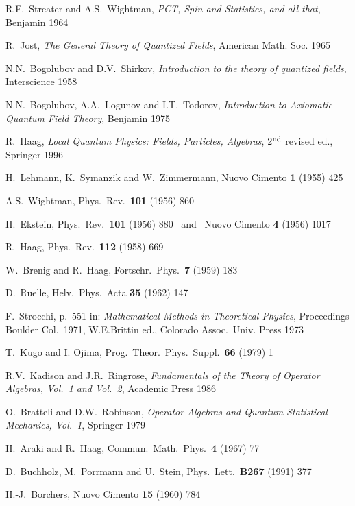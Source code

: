 \begin{thebibliography}{99}
\small 
{}
R.F.\ Streater and A.S.\ Wightman,
{\em PCT, Spin and Statistics, and all that},  
Benjamin 1964 

R.\ Jost,  
{\em The General Theory of Quantized Fields}, 
American Math. Soc. 1965 

 N.N.\ Bogolubov and D.V.\ Shirkov, 
{\em Introduction to the theory of quantized fields}, 
Interscience 1958 

N.N.\ Bogolubov, A.A.\ Logunov and I.T.\ Todorov, 
{\em Introduction to Axiomatic Quantum Field Theory}, 
Benjamin 1975

R.\ Haag, 
{\em Local Quantum Physics: Fields, Particles, Algebras},
2$^{\rm nd}$ revised ed.,  
Springer 1996 

H.\ Lehmann, K.\ Symanzik and W.\ Zimmermann, 
Nuovo Cimento {\bf 1} (1955) 425

 A.S.\ Wightman, Phys.\ Rev.\ {\bf 101} (1956) 860

 H.\ Ekstein, Phys.\ Rev.\ {\bf 101} (1956) 880
\ and \ Nuovo Cimento {\bf 4} (1956) 1017 

 R.\ Haag, Phys.\ Rev.\ {\bf 112} (1958) 669

 W.\ Brenig and R.\ Haag, Fortschr.\ Phys.\ {\bf 7}
(1959) 183

 D.\ Ruelle, Helv.\ Phys.\ Acta {\bf 35} (1962) 147

 F.\ Strocchi, 
p.\ 551 in: {\em Mathematical Methods in 
Theoretical Physics}, Proceedings Boulder Col.\ 1971, W.E.Brittin ed., 
Colorado Assoc.\ Univ. Press 1973

 T.\ Kugo and I. Ojima, 
Prog.\ Theor.\ Phys.\ Suppl.\ {\bf 66} (1979) 1

 R.V.\ Kadison and J.R.\ Ringrose,
{\it Fundamentals of the Theory of Operator Algebras, Vol.\ 1 and 
Vol.\ 2}, Academic Press 1986

 O.\ Bratteli and D.W.\ Robinson, {\it Operator Algebras
and Quantum Statistical Mechanics, Vol.\ 1}, Springer 1979

 H.\ Araki and R.\ Haag, Commun.\ Math.\ Phys.\ {\bf 4}
(1967) 77

 D.\ Buchholz, M.\ Porrmann and U.\ Stein, 
Phys.\ Lett.\ {\bf B267} (1991) 377 

 H.-J.\ Borchers, Nuovo Cimento {\bf 15} (1960) 784 


\end{thebibliography}
